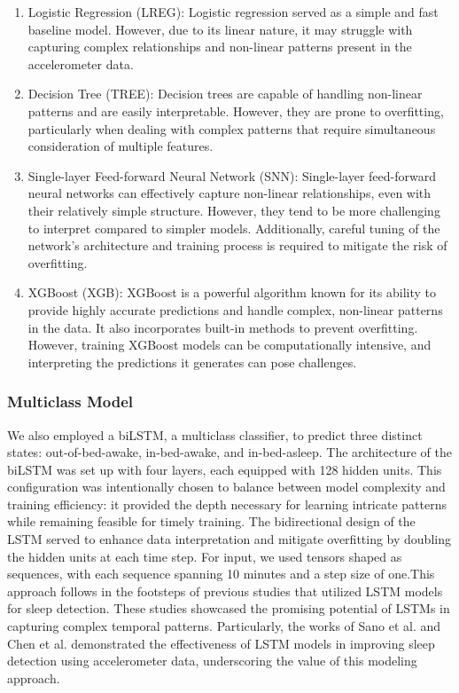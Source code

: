 \documentclass[
  super,
  preprint,
  3p]{elsarticle}
\begin{document}
\begin{enumerate}
\def\labelenumi{\arabic{enumi}.}
\item
  Logistic Regression (LREG): Logistic regression served as a simple and
  fast baseline model. However, due to its linear nature, it may
  struggle with capturing complex relationships and non-linear patterns
  present in the accelerometer data.
\item
  Decision Tree (TREE): Decision trees are capable of handling
  non-linear patterns and are easily interpretable. However, they are
  prone to overfitting, particularly when dealing with complex patterns
  that require simultaneous consideration of multiple features.
\item
  Single-layer Feed-forward Neural Network (SNN): Single-layer
  feed-forward neural networks can effectively capture non-linear
  relationships, even with their relatively simple structure. However,
  they tend to be more challenging to interpret compared to simpler
  models. Additionally, careful tuning of the network's architecture and
  training process is required to mitigate the risk of overfitting.
\item
  XGBoost (XGB): XGBoost is a powerful algorithm known for its ability
  to provide highly accurate predictions and handle complex, non-linear
  patterns in the data. It also incorporates built-in methods to prevent
  overfitting. However, training XGBoost models can be computationally
  intensive, and interpreting the predictions it generates can pose
  challenges.
\end{enumerate}

\hypertarget{multiclass-model}{%
\subsubsection{Multiclass Model}\label{multiclass-model}}

We also employed a biLSTM, a multiclass classifier, to predict three
distinct states: out-of-bed-awake, in-bed-awake, and in-bed-asleep. The
architecture of the biLSTM was set up with four layers, each equipped
with 128 hidden units. This configuration was intentionally chosen to
balance between model complexity and training efficiency: it provided
the depth necessary for learning intricate patterns while remaining
feasible for timely training. The bidirectional design of the LSTM
served to enhance data interpretation and mitigate overfitting by
doubling the hidden units at each time step. For input, we used tensors
shaped as sequences, with each sequence spanning 10 minutes and a step
size of one.This approach follows in the footsteps of previous studies
that utilized LSTM models for sleep detection. These studies showcased
the promising potential of LSTMs in capturing complex temporal patterns.
Particularly, the works of Sano et al. \citep{sano2019} and Chen et al.
\citep{chen2021} demonstrated the effectiveness of LSTM models in
improving sleep detection using accelerometer data, underscoring the
value of this modeling approach.
\end{document}
